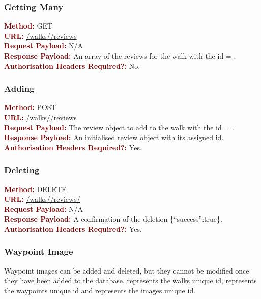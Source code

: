 \documentclass[11pt,a4paper]{report}
\begin{document}
\subsubsection{Getting Many}
\textbf{\textcolor{Maroon}{Method:}} GET\\
\textbf{\textcolor{Maroon}{URL:}} \url{/walks/}\url{/reviews}\\
\textbf{\textcolor{Maroon}{Request Payload:}} N/A\\
\textbf{\textcolor{Maroon}{Response Payload:}} An array of the reviews for the walk with the id = .\\
\textbf{\textcolor{Maroon}{Authorisation Headers Required?:}} No.

\subsubsection{Adding}
\textbf{\textcolor{Maroon}{Method:}} POST\\
\textbf{\textcolor{Maroon}{URL:}} \url{/walks/}\url{/reviews}\\
\textbf{\textcolor{Maroon}{Request Payload:}} The review object to add to the walk with the id = .\\
\textbf{\textcolor{Maroon}{Response Payload:}} An initialised review object with its assigned id.\\
\textbf{\textcolor{Maroon}{Authorisation Headers Required?:}} Yes.

\subsubsection{Deleting}
\textbf{\textcolor{Maroon}{Method:}} DELETE\\
\textbf{\textcolor{Maroon}{URL:}} \url{/walks/}\url{/reviews/}\\
\textbf{\textcolor{Maroon}{Request Payload:}} N/A\\
\textbf{\textcolor{Maroon}{Response Payload:}} A confirmation of the deletion \{``success'':true\}.\\
\textbf{\textcolor{Maroon}{Authorisation Headers Required?:}} Yes.

\subsubsection{Waypoint Image}
Waypoint images can be added and deleted, but they cannot be modified once they have been added to the database.  represents the walks unique id,  represents the waypoints unique id and  represents the images unique id. 
\end{document}
